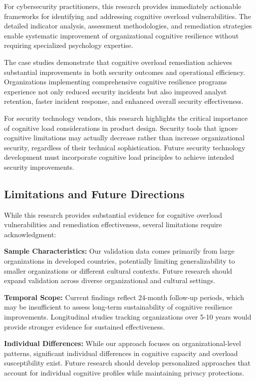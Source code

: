 \documentclass[11pt,a4paper]{article}
\begin{document}
For cybersecurity practitioners, this research provides immediately actionable frameworks for identifying and addressing cognitive overload vulnerabilities. The detailed indicator analysis, assessment methodologies, and remediation strategies enable systematic improvement of organizational cognitive resilience without requiring specialized psychology expertise.

The case studies demonstrate that cognitive overload remediation achieves substantial improvements in both security outcomes and operational efficiency. Organizations implementing comprehensive cognitive resilience programs experience not only reduced security incidents but also improved analyst retention, faster incident response, and enhanced overall security effectiveness.

For security technology vendors, this research highlights the critical importance of cognitive load considerations in product design. Security tools that ignore cognitive limitations may actually decrease rather than increase organizational security, regardless of their technical sophistication. Future security technology development must incorporate cognitive load principles to achieve intended security improvements.

\subsection{Limitations and Future Directions}

While this research provides substantial evidence for cognitive overload vulnerabilities and remediation effectiveness, several limitations require acknowledgment:

\textbf{Sample Characteristics:} Our validation data comes primarily from large organizations in developed countries, potentially limiting generalizability to smaller organizations or different cultural contexts. Future research should expand validation across diverse organizational and cultural settings.

\textbf{Temporal Scope:} Current findings reflect 24-month follow-up periods, which may be insufficient to assess long-term sustainability of cognitive resilience improvements. Longitudinal studies tracking organizations over 5-10 years would provide stronger evidence for sustained effectiveness.

\textbf{Individual Differences:} While our approach focuses on organizational-level patterns, significant individual differences in cognitive capacity and overload susceptibility exist. Future research should develop personalized approaches that account for individual cognitive profiles while maintaining privacy protections.
\end{document}

